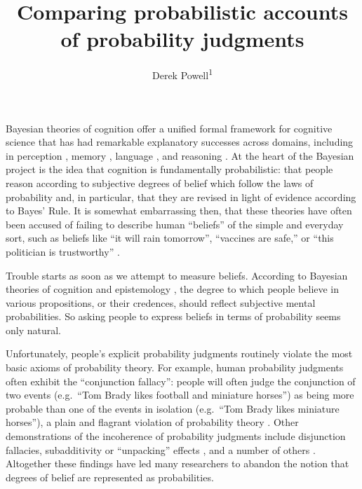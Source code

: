\documentclass[
  man,floatsintext]{apa6}
\title{Comparing probabilistic accounts of probability judgments}
\author{Derek Powell\textsuperscript{1}}
\date{}
\affiliation{\vspace{0.5cm}\textsuperscript{1} Arizona State University, School of Social and Behavioral Sciences}
\begin{document}
\maketitle

Bayesian theories of cognition offer a unified formal framework for cognitive science \autocite{tenenbaum.etal2011} that has had remarkable explanatory successes across domains, including in perception \autocite[e.g.][]{kersten.etal2004}, memory \autocite[e.g.][]{anderson1991}, language \autocite[e.g.][]{xu.tenenbaum2007}, and reasoning \autocite[e.g.][]{lu.etal2012}. At the heart of the Bayesian project is the idea that cognition is fundamentally probabilistic: that people reason according to subjective degrees of belief which follow the laws of probability and, in particular, that they are revised in light of evidence according to Bayes' Rule. It is somewhat embarrassing then, that these theories have often been accused of failing to describe human ``beliefs'' of the simple and everyday sort, such as beliefs like ``it will rain tomorrow'', ``vaccines are safe,'' or ``this politician is trustworthy'' \autocite{chater.etal2020}.

Trouble starts as soon as we attempt to measure beliefs. According to Bayesian theories of cognition and epistemology \autocite{jaynes2003}, the degree to which people believe in various propositions, or their credences, should reflect subjective mental probabilities. So asking people to express beliefs in terms of probability seems only natural.

Unfortunately, people's explicit probability judgments routinely violate the most basic axioms of probability theory. For example, human probability judgments often exhibit the ``conjunction fallacy'': people will often judge the conjunction of two events (e.g.~``Tom Brady likes football and miniature horses'') as being more probable than one of the events in isolation (e.g.~``Tom Brady likes miniature horses''), a plain and flagrant violation of probability theory \autocite{tversky.kahneman1983}. Other demonstrations of the incoherence of probability judgments include disjunction fallacies, subadditivity or ``unpacking'' effects \autocite{tversky.koehler1994}, and a number of others \autocite[for an accessible review, see][]{kahneman2013}. Altogether these findings have led many researchers to abandon the notion that degrees of belief are represented as probabilities.
\end{document}
